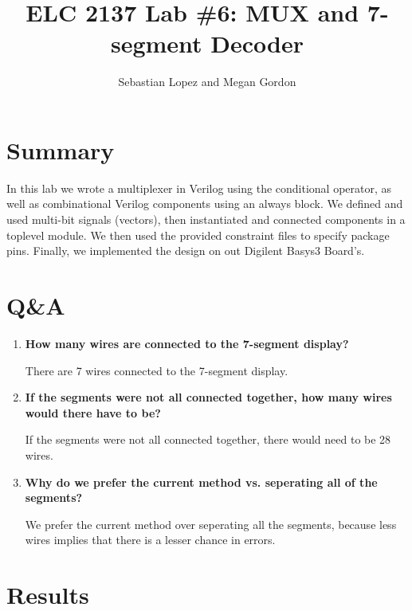 \documentclass[11pt]{article}
\begin{document}
\title{ELC 2137 Lab \#6: MUX and 7-segment Decoder}
\author{Sebastian Lopez and Megan Gordon}

\maketitle


\section*{Summary}

In this lab we wrote a multiplexer in Verilog using the conditional operator, as well as combinational Verilog components using an always block. We defined and used multi-bit signals (vectors), then instantiated and connected components in a toplevel module. We then used the provided constraint files to specify package pins. Finally, we implemented the design on out Digilent Basys3 Board's.  

\section*{Q\&A}

	\begin{enumerate}
		\item \textbf{How many wires are connected to the 7-segment display?}
		
		There are 7 wires connected to the 7-segment display. 
		
		\item \textbf{If the segments were not all connected together, how many wires would there have to be?}
		
		If the segments were not all connected together, there would need to be 28 wires. 
		
		\item \textbf{Why do we prefer the current method vs. seperating all of the segments?}
		
		We prefer the current method over seperating all the segments, because less wires implies that there is a lesser chance in errors.
		
	\end{enumerate}

\section*{Results}
\end{document}
